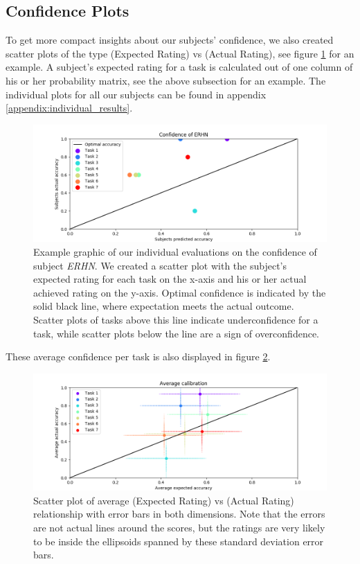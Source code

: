 \documentclass[../main/main.tex]{subfiles}
\begin{document}
\subsection{Confidence Plots}
To get more compact insights about our subjects' confidence, we also created scatter plots of the type (Expected Rating) vs (Actual Rating), see figure \ref{fig:erhn_confidence} for an example. A subject's expected rating for a task is calculated out of one column of his or her probability matrix, see the above subsection for an example. The individual plots for all our subjects can be found in appendix \ref{appendix:individual_results}.

\begin{figure}[H]
	\centering
	\includegraphics[width=\textwidth]{../assets/ERHN_confidence.png}
	\caption{Example graphic of our individual evaluations on the confidence of subject \textit{ERHN}. We created a scatter plot with the subject's expected rating for each task on the x-axis and his or her actual achieved rating on the y-axis. Optimal confidence is indicated by the solid black line, where expectation meets the actual outcome. Scatter plots of tasks above this line indicate underconfidence for a task, while scatter plots below the line are a sign of overconfidence.}
	\label{fig:erhn_confidence} 
\end{figure}

These average confidence per task is also displayed in figure \ref{fig:avg_confidence}.

\begin{figure}[H]
	\centering
	\includegraphics[width=\textwidth]{../assets/average_calibration.png}
	\caption{Scatter plot of average (Expected Rating) vs (Actual Rating) relationship with error bars in both dimensions. Note that the errors are not actual lines around the scores, but the ratings are very likely to be inside the ellipsoids spanned by these standard deviation error bars.}
	\label{fig:avg_confidence} 
\end{figure}
\end{document}
